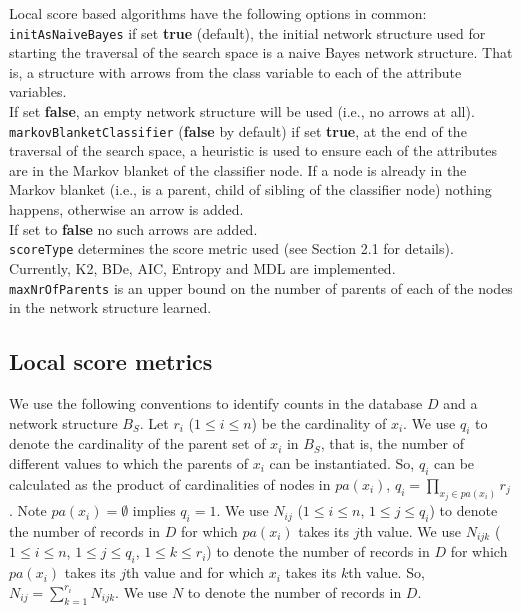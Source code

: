 \documentclass[a4paper]{article}
\begin{document}
\begin{center}
\end{center}


Local score based algorithms have the following options in common:\\
{\tt initAsNaiveBayes} if set {\bf true} (default), the initial network structure used
for starting the traversal of the search space is a naive Bayes network 
structure. That is, a structure with arrows from the class variable to
each of the attribute variables.\\
If set {\bf false}, an empty network structure will be used (i.e., no arrows at all).\\
{\tt markovBlanketClassifier} (\textbf{false} by default) if set {\bf true},
at the end of the traversal of the search space, a heuristic is used
to ensure each of the attributes are in the Markov blanket of the 
classifier node. If a node is already in the Markov blanket (i.e., is
a parent, child of sibling of the classifier node) nothing happens,
otherwise an arrow is added.\\
If set to {\bf false} no such arrows are added.\\
{\tt scoreType} determines the score metric used (see Section 2.1
for details). Currently, K2, BDe, AIC, Entropy and MDL are implemented.\\
{\tt maxNrOfParents} is an upper bound on the number of parents of each of the
nodes in the network structure learned.

\subsection{Local score metrics \label{sec.score.metric}}

We use the following conventions to identify counts in the database
$D$ and a network structure $B_S$.  Let $r_i$ ($1\le i\le n$) be the
cardinality of $x_i$.  We use $q_i$ to denote the cardinality of the
parent set of $x_i$ in $B_S$,  that is, the number of different values
to which the parents of $x_i$ can be  instantiated.  So, $q_i$ can be
calculated as the product of cardinalities of nodes in $pa(x_i)$,
$q_i=\prod_{x_j\in pa(x_i)}r_j$.  Note $pa(x_i)=\emptyset$ implies
$q_i=1$.
%
 We use $N_{ij}$ ($1\le i\le n$, $1\le j\le q_i$) to denote the number
of records in $D$ for which $pa(x_i)$ takes its $j$th value.%
We use $N_{ijk}$ ($1\le i\le n$, $1\le j\le q_i$, $1\le k\le r_i$) to
denote the number of records in $D$ for which $pa(x_i)$ takes its
$j$th value and for which $x_i$ takes its $k$th value.
%
So, $N_{ij}=\sum_{k=1}^{r_i}N_{ijk}$.  We use $N$ to denote the number
of records in $D$.
\end{document}
